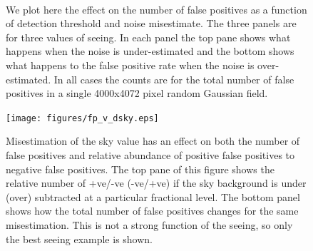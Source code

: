\documentclass[prd, nofootinbib, floatfix, 11pt,tightenlines,times]{article}
\begin{document}
\begin{figure}
\centering
{}\qquad
{}\\
\caption{
We plot here the effect on the number of false positives as a function of detection threshold and noise misestimate.  The three panels 
are for three values of seeing.  In each panel the top pane shows what happens when the noise is under-estimated and the
bottom shows what happens to the false positive rate when the noise is over-estimated.  In all cases the counts are for
the total number of false positives in a single 4000x4072 pixel random Gaussian field.
}
\label{fig-fpthresh}
\end{figure}

\begin{figure}
\centering
\texttt{[image: figures/fp\_v\_dsky.eps]}
\caption{
Misestimation of the sky value has an effect on both the number of false positives and relative abundance of positive false positives to negative false positives.
The top pane of this figure shows the relative number of +ve/-ve (-ve/+ve) if the sky background is under (over) subtracted at a particular fractional level.  The 
bottom panel shows how the total number of false positives changes for the same misestimation.  This is not a strong function of the seeing, so only the best
seeing example is shown.
}
\label{fig-skythresh}
\end{figure}
\end{document}
